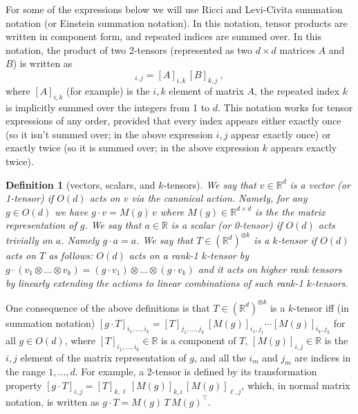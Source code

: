 \documentclass{article}
\theoremstyle{plain}
\newtheorem{definition}{Definition}
\begin{document}
For some of the expressions below we will use Ricci and Levi-Civita summation notation (or Einstein summation notation).
In this notation, tensor products are written in component form, and repeated indices are summed over.
In this notation, the product of two 2-tensors (represented as two $d\times d$ matrices $A$ and $B$) is written as
\begin{equation}
    [A\, B]_{i,j} = [A]_{i,k}\,[B]_{k,j} ~,
\end{equation}
where $[A]_{i,k}$ (for example) is the $i,k$ element of matrix $A$, the repeated index $k$ is implicitly summed over the integers from 1 to $d$.
This notation works for tensor expressions of any order, provided that every index appears either exactly once (so it isn't summed over; in the above expression $i, j$ appear exactly once) or exactly twice (so it is summed over; in the above expression $k$ appears exactly twice). 

\begin{definition}[vectors, scalars, and $k$-tensors] \label{def.tensors}
We say that $v\in \mathbb R^d$ is a vector (or 1-tensor) if $O(d)$ acts on $v$ via the canonical action. Namely, for any $g\in O(d)$ we have $g\cdot v = M(g)\, v$ where $M(g)\in \mathbb R^{d\times d}$ is the the matrix representation of $g$. We say that $a\in \mathbb R$ is a scalar (or 0-tensor) if $O(d)$ acts trivially on $a$. Namely $g\cdot a = a$.
We say that $T\in (\mathbb R^d)^{\otimes k}$ is a $k$-tensor if $O(d)$ acts on $T$ as follows:
$O(d)$ acts on a rank-1 $k$-tensor by $g\cdot (v_{1}\otimes\ldots \otimes v_k) = (g\cdot v_1)\otimes \ldots \otimes (g\cdot v_k)$ and it acts on higher rank tensors by linearly extending the actions to linear combinations of such rank-1 $k$-tensors.
\end{definition}

One consequence of the above definitions is that 
$T\in (\mathbb R^d)^{\otimes k}$ is a $k$-tensor iff (in summation notation)
$[g\cdot T]_{i_1,\ldots, i_k} = [T]_{j_1,\ldots,j_k}\,[M(g)]_{i_1,j_1}\cdots[M(g)]_{i_k,j_k}$ for all $g\in O(d)$, where $[T]_{i_1, \ldots ,i_k} \in \mathbb R$ is a component of $T$, $[M(g)]_{i,j}\in\mathbb R$ is the $i,j$ element of the matrix representation of $g$, and all the $i_m$ and $j_m$ are indices in the range $1,\ldots,d$.
For example, a 2-tensor is defined by its transformation property
$[g\cdot T]_{i,j} = [T]_{k,\ell}\,[M(g)]_{k,i}\,[M(g)]_{\ell,j}$,
which, in normal matrix notation, is written as
$g\cdot T = M(g)\,T\,M(g)^\top$.
\end{document}
